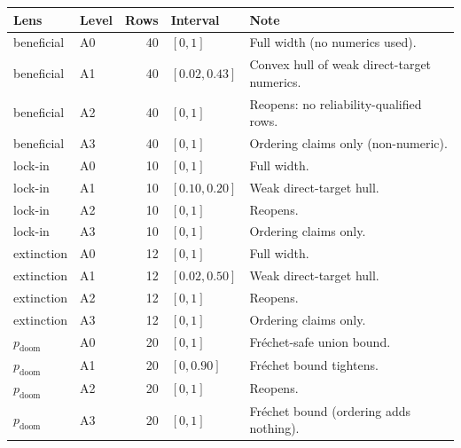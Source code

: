 \scriptsize
\begin{tabular}{p{}lrlp{}}
\toprule
Lens & Level & Rows & Interval & Note \\
\midrule
beneficial & A0 & 40 & $[0, 1]$ & Full width (no numerics used). \\
beneficial & A1 & 40 & $[0.02, 0.43]$ & Convex hull of weak direct-target numerics. \\
beneficial & A2 & 40 & $[0, 1]$ & Reopens: no reliability-qualified rows. \\
beneficial & A3 & 40 & $[0, 1]$ & Ordering claims only (non-numeric). \\
\midrule
lock-in & A0 & 10 & $[0, 1]$ & Full width. \\
lock-in & A1 & 10 & $[0.10, 0.20]$ & Weak direct-target hull. \\
lock-in & A2 & 10 & $[0, 1]$ & Reopens. \\
lock-in & A3 & 10 & $[0, 1]$ & Ordering claims only. \\
\midrule
extinction & A0 & 12 & $[0, 1]$ & Full width. \\
extinction & A1 & 12 & $[0.02, 0.50]$ & Weak direct-target hull. \\
extinction & A2 & 12 & $[0, 1]$ & Reopens. \\
extinction & A3 & 12 & $[0, 1]$ & Ordering claims only. \\
\midrule
$p_{\mathrm{doom}}$ & A0 & 20 & $[0, 1]$ & Fr\'{e}chet-safe union bound. \\
$p_{\mathrm{doom}}$ & A1 & 20 & $[0, 0.90]$ & Fr\'{e}chet bound tightens. \\
$p_{\mathrm{doom}}$ & A2 & 20 & $[0, 1]$ & Reopens. \\
$p_{\mathrm{doom}}$ & A3 & 20 & $[0, 1]$ & Fr\'{e}chet bound (ordering adds nothing). \\
\bottomrule
\end{tabular}
